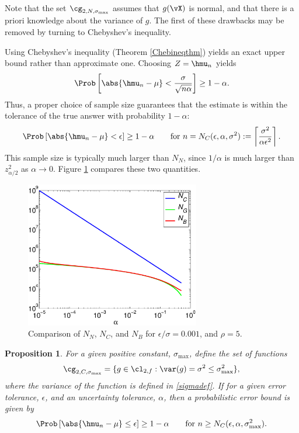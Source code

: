 \documentclass[12pt]{amsart}
\newtheorem{prop}[theorem]{Proposition}
\begin{document}
Note that the set $\cg_{2,N,\sigma_{\max}}$ assumes that $g(\vX)$ is normal, and that there is a priori knowledge about the variance of $g$.  The first of these drawbacks may be removed by turning to Chebyshev's inequality.

Using Chebyshev's inequality (Theorem \ref{Chebineqthm}) yields an exact upper bound rather than approximate one.  Choosing $Z=\hmu_n$ yields
\[
\Prob\left[\abs{\hmu_n-\mu} < \frac{\sigma}{\sqrt{n \alpha}} \right] \ge 1-\alpha.
\]
Thus, a proper choice of sample size guarantees that the estimate is within the tolerance of the true answer with probability $1-\alpha$:
\begin{equation} \label{Cheberr}
\Prob\left[\abs{\hmu_n-\mu} < \epsilon \right] \ge 1-\alpha \qquad \text{for } n= N_C(\epsilon,\alpha,\sigma^2):= \left \lceil \frac{\sigma^2}{\alpha\epsilon^2} \right \rceil.
\end{equation}
This sample size is typically much larger than $N_N$, since $1/\alpha$ is much larger than $z_{\alpha/2}^2$ as $\alpha \to 0$.  Figure \ref{alphacomparefig} compares these two quantities.

\begin{figure}
\centering
\includegraphics[width=3in]{alphacompare.eps}
\caption{Comparison of $N_N$, $N_C$, and $N_B$ for $\epsilon/\sigma = 0.001$, and $\rho=5$. \label{alphacomparefig}}
\end{figure}

\begin{prop} \label{nonadaptChebprop} For a given positive constant, $\sigma_{\max}$, define the set of functions
\[
\cg_{2,C,\sigma_{\max}}= \{g \in \cl_{2,f} : \var(g)= \sigma^2 \le \sigma^2_{\max} \},
\]
where the variance of the function is defined in \eqref{sigmadef}.  If for a given error tolerance, $\epsilon$, and an uncertainty tolerance, $\alpha$, then a probabilistic error bound is given by
\[
\Prob\left[\abs{\hmu_n-\mu} \le \epsilon \right] \ge 1-\alpha \qquad \text{for } n\ge N_{C}(\epsilon,\alpha,\sigma_{\max}^2).
\]
\end{prop}
\end{document}
